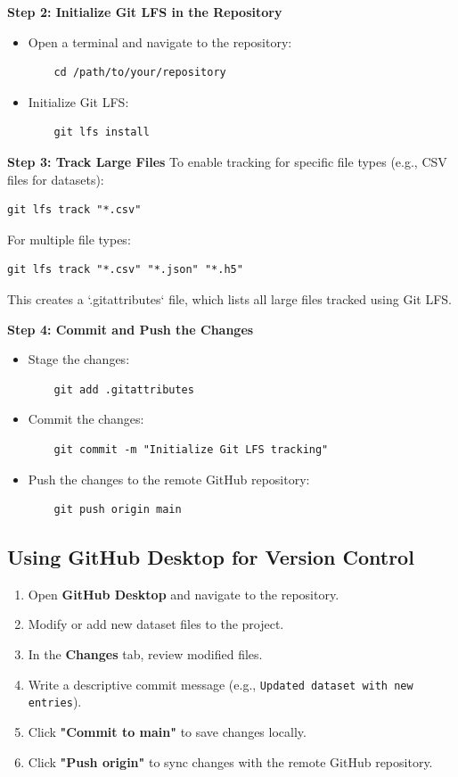 \textbf{Step 2: Initialize Git LFS in the Repository}
\begin{itemize}
    \item Open a terminal and navigate to the repository:
    \begin{verbatim}
    cd /path/to/your/repository
    \end{verbatim}
    \item Initialize Git LFS:
    \begin{verbatim}
    git lfs install
    \end{verbatim}
\end{itemize}

\textbf{Step 3: Track Large Files}
To enable tracking for specific file types (e.g., CSV files for datasets):
\begin{verbatim}
git lfs track "*.csv"
\end{verbatim}

For multiple file types:
\begin{verbatim}
git lfs track "*.csv" "*.json" "*.h5"
\end{verbatim}

This creates a `.gitattributes` file, which lists all large files tracked using Git LFS.

\textbf{Step 4: Commit and Push the Changes}
\begin{itemize}
    \item Stage the changes:
    \begin{verbatim}
    git add .gitattributes
    \end{verbatim}
    \item Commit the changes:
    \begin{verbatim}
    git commit -m "Initialize Git LFS tracking"
    \end{verbatim}
    \item Push the changes to the remote GitHub repository:
    \begin{verbatim}
    git push origin main
    \end{verbatim}
\end{itemize}

\subsection{Using GitHub Desktop for Version Control}
\begin{enumerate}
    \item Open \textbf{GitHub Desktop} and navigate to the repository.
    \item Modify or add new dataset files to the project.
    \item In the \textbf{Changes} tab, review modified files.
    \item Write a descriptive commit message (e.g., \texttt{Updated dataset with new entries}).
    \item Click \textbf{"Commit to main"} to save changes locally.
    \item Click \textbf{"Push origin"} to sync changes with the remote GitHub repository.
\end{enumerate}

